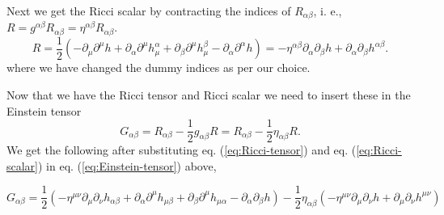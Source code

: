 \documentclass[10pt]{article}
\begin{document}
\begin{enumerate}
    Next we get the Ricci scalar by contracting the indices of $R_{\alpha\beta}$, i. e., $R = g^{\alpha\beta}R_{\alpha\beta} = \eta^{\alpha\beta} R_{\alpha\beta}$.
    \begin{equation}
        \label{eq:Ricci-scalar}
        R = \frac{1}{2}(-\partial_\mu\partial^\mu h + \partial_\alpha \partial^\mu h_{\mu}^{\alpha} + \partial_\beta \partial^{\mu} h_{\mu}^{\beta} - \partial_\alpha\partial^\alpha h) = -\eta^{\alpha\beta}\partial_{\alpha}\partial_\beta h + \partial_\alpha\partial_\beta h^{\alpha\beta}.
    \end{equation}
    where we have changed the dummy indices as per our choice.
    
    Now that we have the Ricci tensor and Ricci scalar we need to insert these in the Einstein tensor
    \begin{equation}
        \label{eq:Einstein-tensor}
        G_{\alpha\beta} = R_{\alpha\beta} - \frac{1}{2}g_{\alpha\beta}R = R_{\alpha\beta} - \frac{1}{2}\eta_{\alpha\beta}R.
    \end{equation}
    We get the following after substituting eq. (\ref{eq:Ricci-tensor}) and eq. (\ref{eq:Ricci-scalar}) in eq. (\ref{eq:Einstein-tensor}) above,
    
    \begin{equation}
        \label{eq:linearized-Einstein-tensor-in-h}
        G_{\alpha\beta} = \frac{1}{2}(-\eta^{\mu\nu}\partial_\mu\partial_\nu h_{\alpha\beta} + \partial_\alpha\partial^\mu h_{\mu\beta} + \partial_\beta\partial^\mu h_{\mu\alpha} - \partial_\alpha \partial_\beta h) - \frac{1}{2}\eta_{\alpha\beta}(-\eta^{\mu\nu}\partial_\mu\partial_\nu h + \partial_\mu\partial_\nu h^{\mu\nu})
    \end{equation}
    
\end{enumerate}
\end{document}
